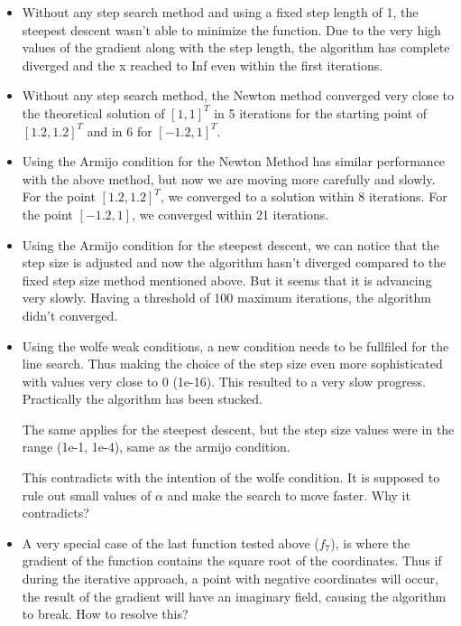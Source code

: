 \documentclass[a4paper,11pt]{article}
\numberwithin{equation}{section} %
\begin{document}
\begin{itemize}
    \item Without any step search method and using a fixed step length of 1, the steepest descent wasn't able to minimize the function. Due to the very high values of the gradient along with the step length, the algorithm has complete diverged and the x reached to Inf even within the first iterations.
    
    \item Without any step search method, the Newton method converged very close to the theoretical solution of $[1,1]^T$ in 5 iterations for the starting point of $[1.2,1.2]^T$ and in 6 for $[-1.2, 1]^T$.
    
    \item Using the Armijo condition for the Newton Method has similar performance with the above method, but now we are moving more carefully and slowly. For the point $[1.2,1.2]^T$, we converged to a solution within 8 iterations. For the point $[-1.2, 1]$, we converged within 21 iterations.
        
    \item Using the Armijo condition for the steepest descent, we can notice that the step size is adjusted and now the algorithm hasn't diverged compared to the fixed step size method mentioned above. But it seems that it is advancing very slowly. Having a threshold of 100 maximum iterations, the algorithm didn't converged.
    
    \item Using the wolfe weak conditions, a new condition needs to be fullfiled for the line search. Thus making the choice of the step size even more sophisticated with values very close to 0 (1e-16). This resulted to a very slow progress. Practically the algorithm has been stucked. 
    
    The same applies for the steepest descent, but the step size values were in the range (1e-1, 1e-4), same as the armijo condition.

    This contradicts with the intention of the wolfe condition. It is supposed to rule out small values of $\alpha$ and make the search to move faster. Why it contradicts?

    \item A very special case of the last function tested above ($f_7$), is where the gradient of the function contains the square root of the coordinates. Thus if during the iterative approach, a point with negative coordinates will occur, the result of the gradient will have an imaginary field, causing the algorithm to break. How to resolve this?
    
\end{itemize} 
\end{document}
